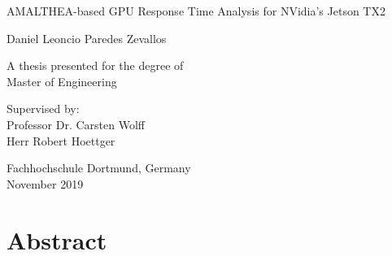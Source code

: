 \documentclass[
  12pt,
  a4paperpaper,
]{report}
\date{}
\begin{document}
\begin{titlepage}
    \begin{center}

        
        \vspace*{2.5cm}
        
        \huge
        AMALTHEA-based GPU Response Time Analysis for NVidia's Jetson TX2
        
        \vspace{1.5cm}
        
        \Large
        Daniel Leoncio Paredes Zevallos 

        \vspace{1.5cm}

        \normalsize
        A thesis presented for the degree of\\
        Master of Engineering
        
        \vfill
        
        \normalsize
        Supervised by:\\
        Professor Dr. Carsten Wolff\\
        Herr Robert Hoettger

        \vspace{0.8cm}

        
        \normalsize
        Fachhochschule Dortmund, Germany\\
        November 2019


    \end{center}
\end{titlepage}

\hypertarget{abstract}{%
\chapter*{Abstract}\label{abstract}}
\end{document}
